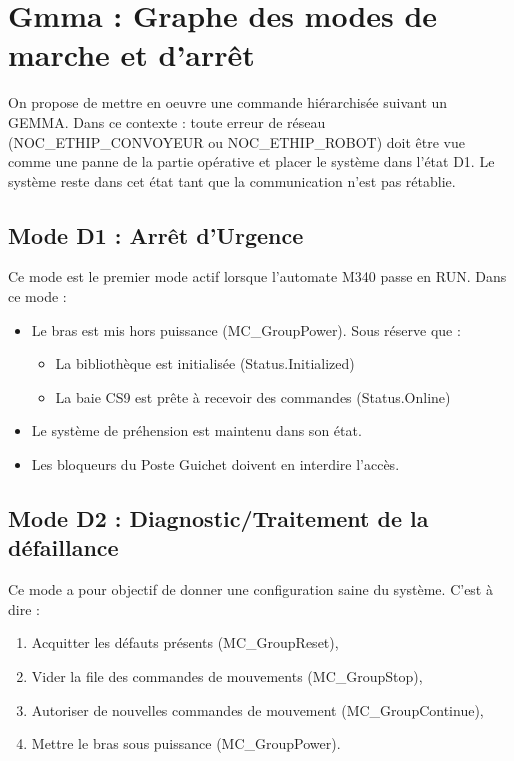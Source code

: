 \section{Gmma : Graphe des modes de marche et d'arrêt}

On propose de mettre en oeuvre une commande hiérarchisée suivant un GEMMA. 
Dans ce contexte : toute erreur de réseau (NOC\_ETHIP\_CONVOYEUR ou NOC\_ETHIP\_ROBOT) doit être vue comme une panne de la partie opérative et placer le système dans l'état D1.
Le système reste dans cet état tant que la communication n'est pas rétablie.

\subsection{Mode D1 : Arrêt d'Urgence}
Ce mode est le premier mode actif lorsque l'automate M340 passe en RUN.
Dans ce mode : 
\begin{itemize}
    \item Le bras est mis hors puissance (MC\_GroupPower). Sous réserve que : 
    \begin{itemize}
        \item La bibliothèque est initialisée (Status.Initialized) 
        \item La baie CS9 est prête à recevoir des commandes (Status.Online)
    \end{itemize}
    \item Le système de préhension est maintenu dans son état.
    \item Les bloqueurs du Poste Guichet doivent en interdire l'accès.
\end{itemize}

\subsection{Mode D2 : Diagnostic/Traitement de la défaillance}
Ce mode a pour objectif de donner une configuration saine du système. C'est à dire : 
\begin{enumerate}
    \item Acquitter les défauts présents (MC\_GroupReset),
    \item Vider la file des commandes de mouvements (MC\_GroupStop),
    \item Autoriser de nouvelles commandes de mouvement (MC\_GroupContinue),
    \item Mettre le bras sous puissance (MC\_GroupPower).
\end{enumerate}

